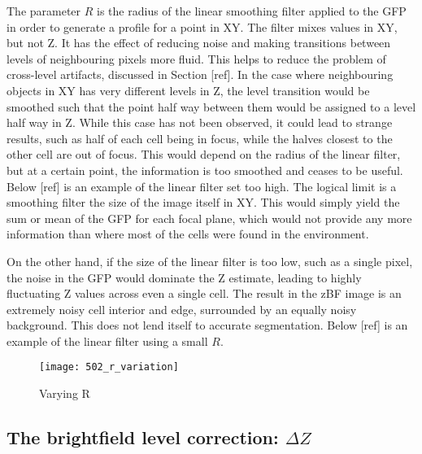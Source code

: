 The parameter $R$ is the radius of the linear smoothing filter applied to the GFP in order to generate a profile for a point in XY. The filter mixes values in XY, but not Z. It has the effect of reducing noise and making transitions between levels of neighbouring pixels more fluid. This helps to reduce the problem of cross-level artifacts, discussed in Section [ref]. In the case where neighbouring objects in XY has very different levels in Z, the level transition would be smoothed such that the point half way between them would be assigned to a level half way in Z. While this case has not been observed, it could lead to strange results, such as half of each cell being in focus, while the halves closest to the other cell are out of focus. This would depend on the radius of the linear filter, but at a certain point, the information is too smoothed and ceases to be useful. Below [ref] is an example of the linear filter set too high. The logical limit is a smoothing filter the size of the image itself in XY. This would simply yield the sum or mean of the GFP for each focal plane, which would not provide any more information than where most of the cells were found in the environment.

On the other hand, if the size of the linear filter is too low, such as a single pixel, the noise in the GFP would dominate the Z estimate, leading to highly fluctuating Z values across even a single cell. The result in the zBF image is an extremely noisy cell interior and edge, surrounded by an equally noisy background. This does not lend itself to accurate segmentation. Below [ref] is an example of the linear filter using a small $R$.

\begin{figure}[p]
 \centering
 \texttt{[image: 502\_r\_variation]}
 \caption{
 	Varying R
 }
 \label{fig:rvariation}
\end{figure}

\subsection{The brightfield level correction: $\Delta Z$}

